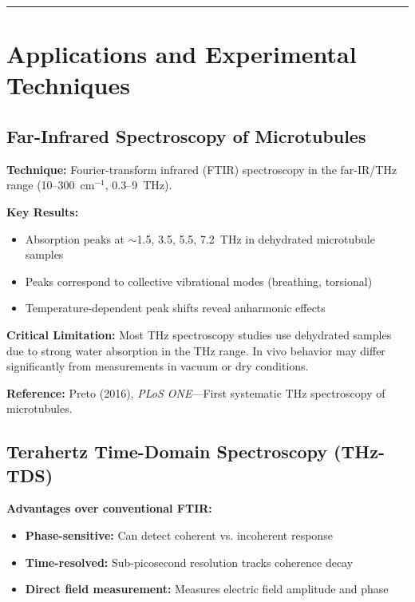 \begin{center}\rule{0.5\linewidth}{0.5pt}\end{center}


\section{Applications and Experimental Techniques}
\label{sec:applications}

\subsection{Far-Infrared Spectroscopy of Microtubules}
\label{subsec:app-ftir}

\textbf{Technique:} Fourier-transform infrared (FTIR) spectroscopy in the far-IR/THz range (10--300~cm$^{-1}$, 0.3--9~THz).

\textbf{Key Results:}
\begin{itemize}
\item Absorption peaks at $\sim$1.5, 3.5, 5.5, 7.2~THz in dehydrated microtubule samples
\item Peaks correspond to collective vibrational modes (breathing, torsional)
\item Temperature-dependent peak shifts reveal anharmonic effects
\end{itemize}

\begin{warningbox}
\textbf{Critical Limitation:} Most THz spectroscopy studies use dehydrated samples due to strong water absorption in the THz range. In vivo behavior may differ significantly from measurements in vacuum or dry conditions.
\end{warningbox}

\textbf{Reference:} Preto (2016), \textit{PLoS ONE}---First systematic THz spectroscopy of microtubules.

\subsection{Terahertz Time-Domain Spectroscopy (THz-TDS)}
\label{subsec:app-thz-tds}

\textbf{Advantages over conventional FTIR:}
\begin{itemize}
\item \textbf{Phase-sensitive:} Can detect coherent vs. incoherent response
\item \textbf{Time-resolved:} Sub-picosecond resolution tracks coherence decay
\item \textbf{Direct field measurement:} Measures electric field amplitude and phase
\end{itemize}

